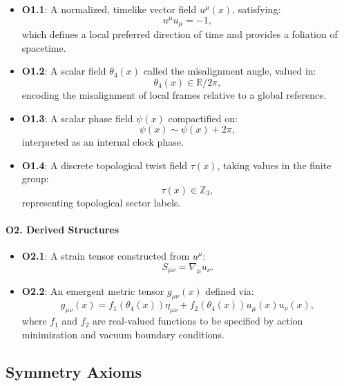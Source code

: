 \documentclass[12pt]{article}
\begin{document}
\begin{itemize}
    \item \textbf{O1.1}: A normalized, timelike vector field \( u^\mu(x) \), satisfying:
    \[
    u^\mu u_\mu = -1,
    \]
    which defines a local preferred direction of time and provides a foliation of spacetime.

    \item \textbf{O1.2}: A scalar field \( \theta_4(x) \) called the misalignment angle, valued in:
    \[
    \theta_4(x) \in \mathbb{R} / 2\pi,
    \]
    encoding the misalignment of local frames relative to a global reference.

    \item \textbf{O1.3}: A scalar phase field \( \psi(x) \) compactified on:
    \[
    \psi(x) \sim \psi(x) + 2\pi,
    \]
    interpreted as an internal clock phase.

    \item \textbf{O1.4}: A discrete topological twist field \( \tau(x) \), taking values in the finite group:
    \[
    \tau(x) \in \mathbb{Z}_3,
    \]
    representing topological sector labels.
\end{itemize}

\paragraph{O2. Derived Structures}
\begin{itemize}
    \item \textbf{O2.1}: A strain tensor constructed from \( u^\mu \):
    \[
    S_{\mu\nu} = \nabla_\mu u_\nu.
    \]

    \item \textbf{O2.2}: An emergent metric tensor \( g_{\mu\nu}(x) \) defined via:
    \[
    g_{\mu\nu}(x) = f_1(\theta_4(x)) \eta_{\mu\nu} + f_2(\theta_4(x)) u_\mu(x) u_\nu(x),
    \]
    where \( f_1 \) and \( f_2 \) are real-valued functions to be specified by action minimization and vacuum boundary conditions.
\end{itemize}

\subsection*{Symmetry Axioms}
\end{document}
